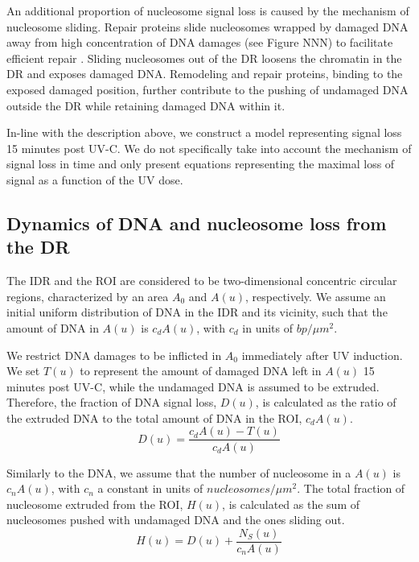 \documentclass[12pt]{article}
\begin{document}
	An additional proportion of nucleosome signal loss is caused by the mechanism of nucleosome sliding. Repair proteins slide nucleosomes wrapped by damaged DNA away from high concentration of DNA damages (see Figure NNN) to facilitate efficient repair \cite{gaillard2003chromatin}. Sliding nucleosomes out of the DR loosens the chromatin in the DR and exposes damaged DNA. Remodeling and repair proteins, binding to the exposed damaged position, further contribute to the pushing of undamaged DNA outside the DR while retaining damaged DNA within it.  

    In-line with the description above, we construct a model representing
	signal loss 15 minutes post UV-C. We do not specifically take into account the
	mechanism of signal loss in time and only present equations representing the maximal loss of signal as a function of the UV dose.
	
	\subsection{Dynamics of DNA and nucleosome loss from the DR}
	The IDR and the ROI are considered to be two-dimensional concentric circular regions, characterized by an area $A_0$ and $A(u)$, respectively. We assume an initial uniform distribution of DNA in the IDR and its vicinity, such that the amount of DNA in $A(u)$ is $c_dA(u)$, with $c_d$ in units of $bp/\mu m^2$. 
	
	We restrict DNA damages to be inflicted in $A_0$ immediately after UV induction. We set $T(u)$ to represent the amount of damaged DNA left in $A(u)$ 15 minutes post UV-C, while the undamaged DNA is assumed to be extruded. Therefore, the fraction of DNA signal loss, $D(u)$, is calculated as the ratio of the extruded DNA to the total amount of DNA in the ROI, $c_dA(u)$. 
	\begin{equation}\label{eq:DNAstst}
	D(u) = \frac{c_dA(u)- T(u)}{c_dA(u)}
	\end{equation}
	
	Similarly to the DNA, we assume that the number of nucleosome in a $A(u)$ is $c_nA(u)$, with $c_n$ a constant in units of $nucleosomes/\mu m^2$. The total fraction of nucleosome extruded from the ROI, $H(u)$, is calculated as the sum of nucleosomes pushed with undamaged DNA and the ones sliding out.
	\begin{equation}\label{eq:nucleosomeStst}
	H(u) = D(u) + \frac{N_S(u)}{c_nA(u)}	
	\end{equation}
	
\end{document}
